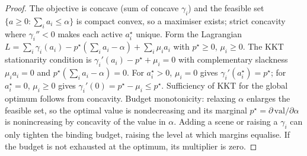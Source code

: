 \documentclass[11pt,twocolumn,a4paper]{article}
\newcommand{\att}{\alpha}            %
\newcommand{\price}{p^{\star}}       %
\newcommand{\alloc}{a}               %
\begin{document}
\begin{proof}
The objective is concave (sum of concave $\gamma_i$) and the feasible set
$\{\alloc\ge0:\sum_i a_i\le\att\}$ is compact convex, so a maximiser
exists; strict concavity where $\gamma_i''<0$ makes each active $a_i^\star$
unique. Form the Lagrangian $L=\sum_i\gamma_i(a_i)-\price(\sum_i
a_i-\att)+\sum_i\mu_i a_i$ with $\price\ge0$, $\mu_i\ge0$. The KKT
stationarity condition is $\gamma_i'(a_i)-\price+\mu_i=0$ with
complementary slackness $\mu_i a_i=0$ and $\price(\sum_i a_i-\att)=0$. For
$a_i^\star>0$, $\mu_i=0$ gives $\gamma_i'(a_i^\star)=\price$; for
$a_i^\star=0$, $\mu_i\ge0$ gives $\gamma_i'(0)=\price-\mu_i\le\price$.
Sufficiency of KKT for the global optimum follows from concavity. Budget
monotonicity: relaxing $\att$ enlarges the feasible set, so the optimal
value is nondecreasing and its marginal $\price=\partial\,\mathrm{val}/
\partial\att$ is nonincreasing by concavity of the value in $\att$. Adding
a scene or raising a $\gamma_i$ can only tighten the binding budget,
raising the level at which margins equalise. If the budget is not
exhausted at the optimum, its multiplier is zero.
\end{proof}
\end{document}
